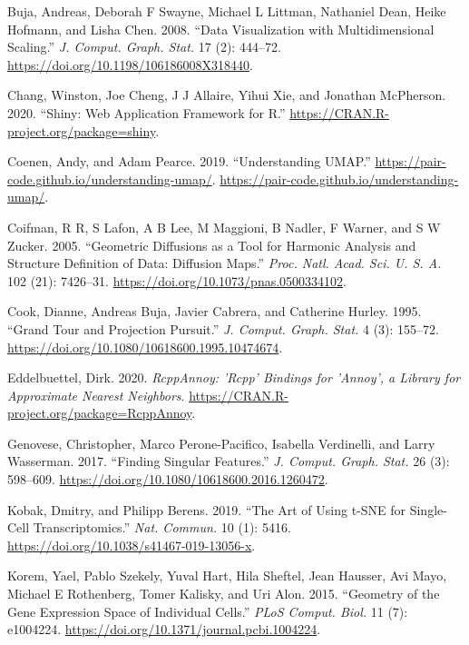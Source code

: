 \documentclass[article,notitle]{jdssv}
\begin{document}
\leavevmode\hypertarget{ref-Buja2008-fn}{}%
Buja, Andreas, Deborah F Swayne, Michael L Littman, Nathaniel Dean, Heike Hofmann, and Lisha Chen. 2008. ``Data Visualization with Multidimensional Scaling.'' \emph{J. Comput. Graph. Stat.} 17 (2): 444--72. \url{https://doi.org/10.1198/106186008X318440}.

\leavevmode\hypertarget{ref-Chang2020-bq}{}%
Chang, Winston, Joe Cheng, J J Allaire, Yihui Xie, and Jonathan McPherson. 2020. ``Shiny: Web Application Framework for R.'' \url{https://CRAN.R-project.org/package=shiny}.

\leavevmode\hypertarget{ref-Coenen2019-to}{}%
Coenen, Andy, and Adam Pearce. 2019. ``Understanding UMAP.'' \url{https://pair-code.github.io/understanding-umap/}. \url{https://pair-code.github.io/understanding-umap/}.

\leavevmode\hypertarget{ref-Coifman2005-ak}{}%
Coifman, R R, S Lafon, A B Lee, M Maggioni, B Nadler, F Warner, and S W Zucker. 2005. ``Geometric Diffusions as a Tool for Harmonic Analysis and Structure Definition of Data: Diffusion Maps.'' \emph{Proc. Natl. Acad. Sci. U. S. A.} 102 (21): 7426--31. \url{https://doi.org/10.1073/pnas.0500334102}.

\leavevmode\hypertarget{ref-Cook1995-bi}{}%
Cook, Dianne, Andreas Buja, Javier Cabrera, and Catherine Hurley. 1995. ``Grand Tour and Projection Pursuit.'' \emph{J. Comput. Graph. Stat.} 4 (3): 155--72. \url{https://doi.org/10.1080/10618600.1995.10474674}.

\leavevmode\hypertarget{ref-rcpp-annoy-pkg}{}%
Eddelbuettel, Dirk. 2020. \emph{RcppAnnoy: 'Rcpp' Bindings for 'Annoy', a Library for Approximate Nearest Neighbors}. \url{https://CRAN.R-project.org/package=RcppAnnoy}.

\leavevmode\hypertarget{ref-Genovese2017-iq}{}%
Genovese, Christopher, Marco Perone-Pacifico, Isabella Verdinelli, and Larry Wasserman. 2017. ``Finding Singular Features.'' \emph{J. Comput. Graph. Stat.} 26 (3): 598--609. \url{https://doi.org/10.1080/10618600.2016.1260472}.

\leavevmode\hypertarget{ref-Kobak2019-lm}{}%
Kobak, Dmitry, and Philipp Berens. 2019. ``The Art of Using t-SNE for Single-Cell Transcriptomics.'' \emph{Nat. Commun.} 10 (1): 5416. \url{https://doi.org/10.1038/s41467-019-13056-x}.

\leavevmode\hypertarget{ref-Korem2015-af}{}%
Korem, Yael, Pablo Szekely, Yuval Hart, Hila Sheftel, Jean Hausser, Avi Mayo, Michael E Rothenberg, Tomer Kalisky, and Uri Alon. 2015. ``Geometry of the Gene Expression Space of Individual Cells.'' \emph{PLoS Comput. Biol.} 11 (7): e1004224. \url{https://doi.org/10.1371/journal.pcbi.1004224}.
\end{document}
